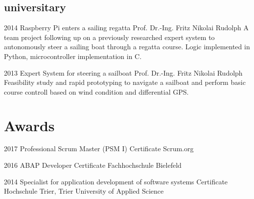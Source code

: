 \documentclass[]{friggeri-cv} %
\begin{document}
\subsection{universitary}

\begin{entrylist}
	
	\entry
	{2014}
	{Raspberry Pi enters a sailing regatta}
	{Prof. Dr.-Ing. Fritz Nikolai Rudolph}
	{A team project following up on a previously researched expert system to autonomously steer a sailing boat through a regatta course. Logic implemented in Python, microcontroller implementation in C.}
	
	
	\entry
	{2013}
	{Expert System for steering a sailboat}
	{Prof. Dr.-Ing. Fritz Nikolai Rudolph}
	{Feasibility study and rapid prototyping to navigate a sailboat and perform basic course controll based on wind condition and differential GPS.}
	
	
\end{entrylist}


\section{Awards}

\begin{entrylist}

	
	\entry
	{2017}
	{Professional Scrum Master (PSM I)}
	{Certificate}
	{Scrum.org}
	
	
	\entry
	{2016}
	{ABAP Developer}
	{Certificate}
	{Fachhochschule Bielefeld}
	
	
	\entry
	{2014}
	{Specialist for application development of software systems}
	{Certificate}
	{Hochschule Trier, Trier University of Applied Science}
	
	
	

\end{entrylist}
\end{document}
